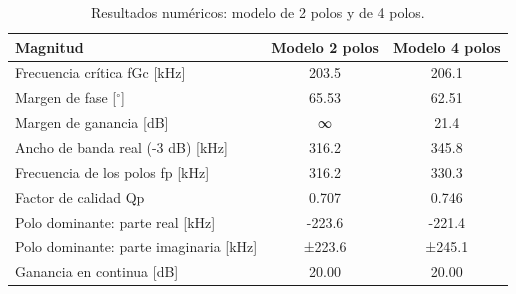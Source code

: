 \begin{table}[H]
\centering
\begin{tabular}{lcc}
\toprule
Magnitud & Modelo 2 polos & Modelo 4 polos \\
\midrule
Frecuencia crítica fGc [kHz] & 203.5 & 206.1 \\
Margen de fase [$^\circ$] & 65.53 & 62.51 \\
Margen de ganancia [dB] & ∞ & 21.4 \\
Ancho de banda real (-3 dB) [kHz] & 316.2 & 345.8 \\
Frecuencia de los polos fp [kHz] & 316.2 & 330.3 \\
Factor de calidad Qp & 0.707 & 0.746 \\
Polo dominante: parte real [kHz] & -223.6 & -221.4 \\
Polo dominante: parte imaginaria [kHz] & ±223.6 & ±245.1 \\
Ganancia en continua [dB] & 20.00 & 20.00 \\
\bottomrule
\end{tabular}
\caption{Resultados numéricos: modelo de 2 polos y de 4 polos.}
\label{tab:modelos_c1}
\end{table}